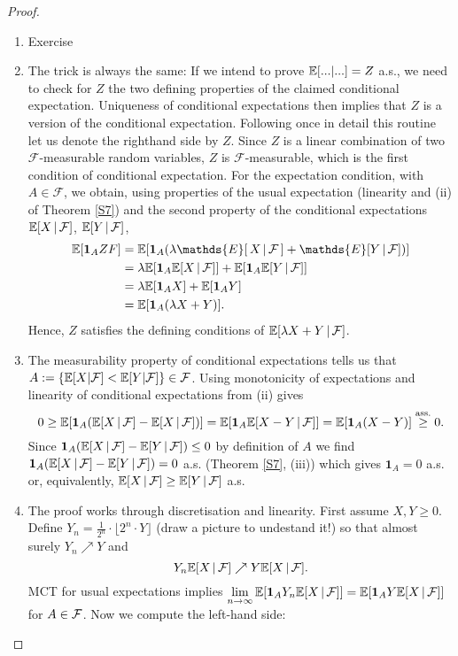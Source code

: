 \begin{proof}[Proof]
	\begin{enumerate}[label=(\roman*)]
		\item Exercise
		\item The trick is always the same: If we intend to prove $\mathbb{E}[...|...]=Z$ a.s., we need to check for $Z$ the two defining properties of the claimed conditional expectation. Uniqueness of conditional expectations then implies that $Z$ is a version of the conditional expectation. Following once in detail this routine let us denote the righthand side by $Z$. Since $Z$ is a linear combination of two $\mathcal F$-measurable random variables, $Z$ is $\mathcal F$-measurable, which is the first condition of conditional expectation. For the expectation condition, with $A\in\mathcal F$, we obtain, using properties of the usual expectation (linearity and (ii) of Theorem \ref{S7}) and the second property of the conditional expectations $\mathbb{E}[X\,|\,\mathcal F]$, $\mathbb{E}[Y\,|\, \mathcal F]$,
			\begin{align*}
				\E[\mathbf 1_A Z F]&=\mathbb E[\mathbf{1}_A(\lambda\mathds{E}[\, X \, | \, \mathcal{F}\, ]+\mathds{E}[Y \, | \, \mathcal{F}])]\\
				&=\lambda\mathbb E[\mathbf{1}_A\mathbb E[X\,|\,\cF]]+\mathbb E[\mathbf{1}_A\mathbb E[Y\,|\,\cF]]\\
					&=\lambda\mathbb E[\mathbf{1}_A X]+\mathbb E[\mathbf{1}_A Y]\\
					&=\mathbb E[\mathbf 1_A (\lambda X+Y)].
			\end{align*}
			Hence, $Z$ satisfies the defining conditions of $\mathbb{E}[\lambda X+Y\, |\, \mathcal F]$.
		\item \label{ii} The measurability property of conditional expectations tells us that $A:=\lbrace\mathbb E[X|\mathcal{F}]<\mathbb E[Y|\mathcal{F}]\rbrace\in \mathcal{F}$. Using monotonicity of expectations and linearity of conditional expectations from (ii) gives
			$$0 \geq \mathbb E[\mathbf 1_A (\mathbb E[X\,|\,\mathcal{F}]-\mathbb E[X\,|\,\mathcal{F}])] =\mathbb E[\mathbf 1_A \mathbb E[X-Y\,|\,\mathcal{F}]] = \mathbb E[\mathbf 1_A (X-Y)]\overset{\text{ass.}}{\geq} 0.$$ Since $\mathbf 1_A (\mathbb E[X\,|\,\mathcal{F}]-\mathbb E[Y\,|\,\mathcal{F}]) \leq 0$ by definition of $A$ we find $\mathbf 1_A (\mathbb E[X\,|\,\mathcal{F}]-\mathbb E[Y\,|\,\mathcal{F}]) = 0$ a.s. (Theorem \ref{S7}, (iii)) which gives $\mathbf 1_A = 0$ a.s. or, equivalently, $\mathbb E[X\,|\,\mathcal{F}]\geq\mathbb E[Y\,|\,\mathcal{F}]$ a.s.
		\item The proof works through discretisation and linearity. First assume $X,Y\geq 0$. Define $Y_n = \frac{1}{2^n} \cdot \lfloor 2^n \cdot Y \rfloor$ (draw a picture to undestand it!) so that almost surely $Y_n \nearrow Y$ and $$Y_n \mathbb E[X\,|\,\mathcal{F}] \nearrow Y \mathbb E[X\,|\,\mathcal{F}].$$ MCT for usual expectations implies $\lim \limits_{n \to \infty}\mathbb E[\mathbf 1_A Y_n \mathbb E[X\,|\,\mathcal{F}]]=\mathbb E[\mathbf 1_A Y \mathbb E[X\,|\,\mathcal{F}]]$ for $A\in\mathcal{F}$. Now we compute the left-hand side:

\end{enumerate}
\end{proof}
